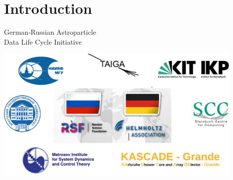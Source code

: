 
\begin{frame}
\titlepage
\end{frame}

\section{Introduction}

\begin{frame}{German-Russian Astroparticle \\Data Life Cycle Initiative\footnotemark[1]}
\vspace{-1.4em}
\begin{center}
  \includegraphics[width=0.9\textwidth]{pics/Collab-4.pdf}
\end{center}
\footnotesize{}
\end{frame}

